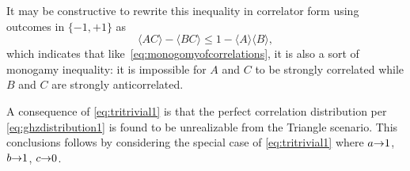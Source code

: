 It may be constructive to rewrite this inequality in correlator form using outcomes in $\{-1,+1\}$ as
\[
	\langle AC\rangle - \langle BC\rangle \leq 1 - \langle A\rangle\langle B\rangle,
\]
which indicates that like~\cref{eq:monogomyofcorrelations}, it is also a sort of monogamy inequality: it is impossible for $A$ and $C$ to be strongly correlated while $B$ and $C$ are strongly anticorrelated.

A consequence of \cref{eq:tritrivial1} is that the perfect correlation distribution per \cref{eq:ghzdistribution1} 
is found to be unrealizable from the Triangle scenario. This conclusions follows by considering the special case of \cref{eq:tritrivial1} where $a\mathord{\to}1$, $b\mathord{\to}1$, $c\mathord{\to}0$.


